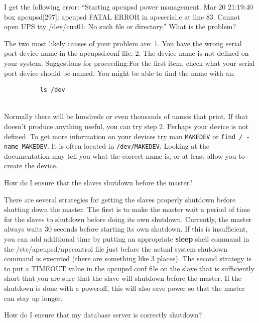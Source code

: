 {{{{{{\begin{description}
{{\item [Q:]
   I get the following error: ``Starting apcupsd power management.  Mar 20
21:19:40 box apcupsd[297]: apcupsd FATAL ERROR in apcserial.c at line 83.
Cannot open UPS tty /dev/cua01: No such file or directory.'' What is the
problem?  

\item [A:]
   The two most likely causes of your problem are:  1. You have the wrong serial
port device name in the apcupsd.conf file. 2. The device name is not defined
on your system. Suggestions for proceeding:For the first item, check what your
serial port device should be named. You might be able to find the name with
an:  

\footnotesize
\begin{verbatim}
          ls /dev
     
\end{verbatim}
\normalsize

Normally there will be hundreds or even thousands of names that print. If that
doesn't produce anything useful, you can try step 2.  Perhaps your device is
not defined. To get more information on your devices try man {\tt MAKEDEV} or
{\tt find / -name MAKEDEV}.  It is often located in {\tt /dev/MAKEDEV}. 
Looking at the documentation may tell you what the correct name is, or at
least allow you to create the device.  

\item [Q:]
   How do I ensure that the slaves shutdown before the master?  

\item [A:]
   There are several strategies for getting the slaves properly shutdown before
shutting down the master. The first is to make the master wait a period of
time for the slaves to shutdown before doing its own shutdown. Currently, the
master always waits 30 seconds before starting its own shutdown. If this is
insufficient, you can add additional time by putting an appropriate {\bf
sleep} shell command in the /etc/apcupsd/apccontrol file just before the
actual system shutdown command is executed (there are something like 3
places). The second strategy is to put a TIMEOUT value in the apcupsd.conf
file on the slave that is sufficiently short that you are sure that the slave
will shutdown before the master. If the shutdown is done with a poweroff, this
will also save power so that the master can stay up longer.  

\item [Q:]
   How do I ensure that my database server is correctly shutdown?  

}}
\end{description}}}}}}}
